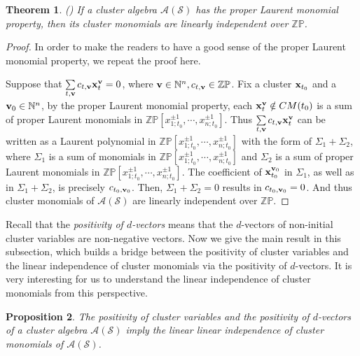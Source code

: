 \documentclass[14pt]{amsart}
\newtheorem{Theorem}{Theorem}[section]
\newtheorem{Proposition}[Theorem]{Proposition}
\begin{document}
\begin{Theorem}\label{lemproper}
 (\cite{CLF}) If a cluster algebra $\mathcal A(\mathcal S)$ has the proper Laurent monomial property, then its cluster monomials are linearly independent over $\mathbb {ZP}$.
\end{Theorem}
\begin{proof}
In order to make the readers to have a good sense of the proper Laurent monomial property, we repeat the proof  here.

Suppose that $\sum\limits_{t, {\bf v}} c_{t,{\bf v}}{\bf x}_t^{\bf v}=0$, where ${\bf v}\in\mathbb N^n, c_{t,{\bf v}}\in\mathbb {ZP}$. Fix a cluster ${\bf x}_{t_0}$ and a ${\bf v}_0\in \mathbb N^n$, by the proper Laurent monomial property,  each ${\bf x}_t^{\bf v}\notin CM(t_0)$ is a sum of proper Laurent monomials in $\mathbb{ZP}[x_{1;t_0}^{\pm1},\cdots,x_{n;t_0}^{\pm1}]$. Thus
$\sum\limits_{t, {\bf v}} c_{t,{\bf v}}{\bf x}_t^{\bf v}$ can be written as a Laurent polynomial in $\mathbb{ZP}[x_{1;t_0}^{\pm1},\cdots,x_{n;t_0}^{\pm1}]$ with the form of $\Sigma_1+\Sigma_2$,
where $\Sigma_1$ is a sum of monomials in $\mathbb{ZP}[x_{1;t_0}^{\pm1},\cdots,x_{n;t_0}^{\pm1}]$ and $\Sigma_2$ is a sum of proper Laurent monomials in $\mathbb{ZP}[x_{1;t_0}^{\pm1},\cdots,x_{n;t_0}^{\pm1}]$.
The coefficient of ${\bf x}_{t_0}^{{\bf v}_0}$  in $\Sigma_1$, as well as in $\Sigma_1+\Sigma_2$, is precisely $c_{t_0,{\bf v}_0}$.
  Then, $\Sigma_1+\Sigma_2=0$ results in $c_{t_0,{\bf v}_0}=0$.
 And thus cluster monomials of $\mathcal A(\mathcal S)$ are linearly independent
over $\mathbb {ZP}$.
\end{proof}

Recall that the {\em positivity of $d$-vectors} means that the $d$-vectors of non-initial cluster variables are non-negative vectors. Now we give the main result in this subsection, which builds a bridge between the positivity of cluster variables and the linear independence of cluster monomials via the positivity of $d$-vectors. It is very interesting for us to understand the linear independence of cluster monomials from this perspective.

\begin{Proposition}\label{thmproper}
The positivity of cluster variables and the positivity of $d$-vectors of a cluster algebra $\mathcal A(\mathcal S)$ imply the linear linear independence of cluster monomials of $\mathcal A(\mathcal S)$.
\end{Proposition}
\end{document}
